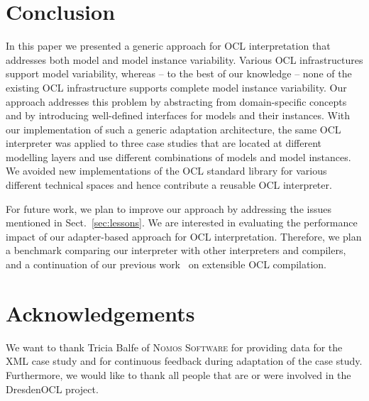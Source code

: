 \section{Conclusion}
\label{sec:conclusion}

In this paper we presented a generic approach for OCL
interpretation that addresses both model and
model instance variability. Various OCL infrastructures support 
model variability, whereas -- to the best of our knowledge -- none of 
the existing OCL infrastructure supports complete model instance
variability. Our approach addresses this problem by
abstracting from domain-specific concepts and by introducing well-defined interfaces for models
and their instances. With our implementation of such a
generic adaptation architecture, the same OCL interpreter was applied to
three case studies that are located at different mo\-del\-ling layers and
use different combinations of models and model instances. We
avoided new implementations of the OCL standard library for various different
technical spaces and hence contribute a reusable OCL interpreter.

For future work, we plan to improve our approach by addressing the issues mentioned 
in Sect.~\ref{sec:lessons}. We are interested in evaluating
the performance impact of our adapter-based approach for OCL interpretation.
Therefore, we plan a benchmark comparing our interpreter with other
interpreters and compilers, and a continuation of our previous
work~\cite{OCLRelDB} on extensible OCL compilation.


\section{Acknowledgements}

We want to thank Tricia Balfe of \textsc{Nomos Software} for providing data for the XML case study and for continuous feedback during adaptation of the case study.
Furthermore, we would like to thank all people that are or were involved in the DresdenOCL project.